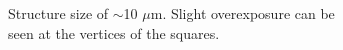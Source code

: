 \begin{figure}[ht]
    \begin{subfigure}[t]{0.24\linewidth}
	\centering
	\caption{Structure size of $\sim$10 $\mu$m. Slight overexposure can be seen at the vertices of the squares.}
	\label{fig:b2d7_q7}
\end{subfigure}
\hfill
    \begin{subfigure}[t]{0.24\linewidth}
	\centering

\end{subfigure}
\end{figure}
